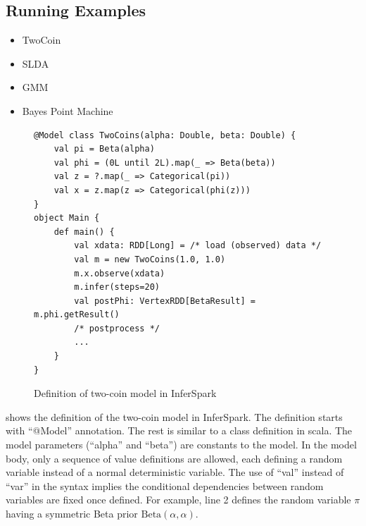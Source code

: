 \subsection{Running Examples}

\begin{itemize}
\item TwoCoin
\item SLDA
\item GMM
\item Bayes Point Machine
\end{itemize}



\begin{figure}[h]
\begin{lstlisting}
@Model class TwoCoins(alpha: Double, beta: Double) {
	val pi = Beta(alpha)
	val phi = (0L until 2L).map(_ => Beta(beta))
	val z = ?.map(_ => Categorical(pi))
	val x = z.map(z => Categorical(phi(z)))
}
object Main {
	def main() {
		val xdata: RDD[Long] = /* load (observed) data */
		val m = new TwoCoins(1.0, 1.0)
		m.x.observe(xdata)
		m.infer(steps=20)
		val postPhi: VertexRDD[BetaResult] = m.phi.getResult()
		/* postprocess */
		...
	}
}
\end{lstlisting}
\caption{Definition of two-coin model in InferSpark}
\label{fig:two_coins_modeldef}
\end{figure}

 shows the definition of the two-coin model
in InferSpark. The definition starts with ``{\sf @Model}'' annotation. 
The rest is similar to a class definition in
scala. The model parameters (``{\sf alpha}'' and ``{\sf beta}'') are constants to the
model. In the model body, only a sequence of value definitions are allowed,
each defining a random variable instead of a normal deterministic variable. 
The use of ``{\sf val}'' instead of ``{\sf var}'' in the syntax 
implies the conditional dependencies between random variables are fixed 
once defined. For example, line
2 defines the random variable $\pi$ having a symmetric Beta prior
$\mathrm{Beta}(\alpha, \alpha)$.

